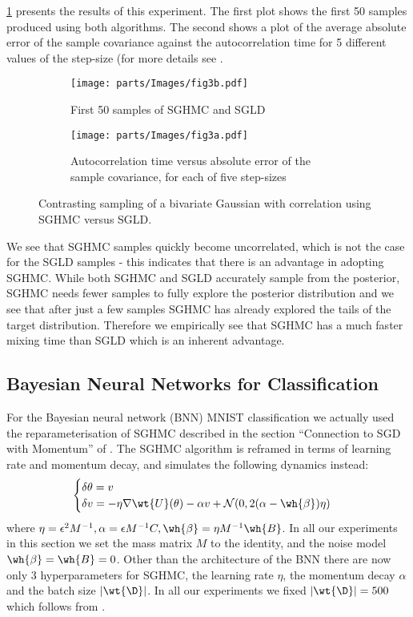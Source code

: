 \cref{fig:sghmc vs sgld} presents the results of this experiment. The first plot shows the first 50 samples produced using both algorithms. The second shows a plot of the average absolute error of the sample covariance against the autocorrelation time for 5 different values of the step-size (for more details see \cite{sghmc}.
\begin{figure}[h!]
  \begin{subfigure}{.5\textwidth}
  \texttt{[image: parts/Images/fig3b.pdf]}
  \caption{First 50 samples of SGHMC and SGLD}
  \end{subfigure}
  \begin{subfigure}{.5\textwidth}
  \texttt{[image: parts/Images/fig3a.pdf]}
  \caption{Autocorrelation time versus absolute error of the sample covariance, for each of five step-sizes}
  \end{subfigure}%
  \caption{Contrasting sampling of a bivariate Gaussian with correlation using SGHMC versus SGLD.}
  \label{fig:sghmc vs sgld}
\end{figure}
We see that SGHMC samples quickly become uncorrelated, which is not the case for the SGLD samples - this indicates that there is an advantage in adopting SGHMC. While both SGHMC and SGLD accurately sample from the posterior, SGHMC needs fewer samples to fully explore the posterior distribution and we see that after just a few samples SGHMC has already explored the tails of the target distribution. Therefore we empirically see that SGHMC has a much faster mixing time than SGLD which is an inherent advantage.

\subsection{Bayesian Neural Networks for Classification}
For the Bayesian neural network (BNN) MNIST classification we actually used the reparameterisation of SGHMC described in the section ``Connection to SGD with Momentum'' of \cite{sghmc}. The SGHMC algorithm is reframed in terms of learning rate and momentum decay, and simulates the following dynamics instead:
$$\begin{cases}
\delta \theta = v\\
\delta v = - \eta \nabla \wt{U}(\theta) - \alpha v + \mathcal{N}(0, 2(\alpha - \wh{\beta}) \eta)
\end{cases}
$$
where $\eta = \epsilon^2 M^{-1}, \alpha = \epsilon M^{-1}C, \wh{\beta} = \eta M^{-1}\wh{B}$. In all our experiments in this section we set the mass matrix $M $ to the identity, and the noise model $\wh{\beta} = \wh{B} = 0$. Other than the architecture of the BNN there are now only 3 hyperparameters for SGHMC, the learning rate $\eta$, the momentum decay $\alpha$ and the batch size $|\wt{\D}|$. In all our experiments we fixed $|\wt{\D}| = 500$ which follows from \cite{sghmc}.

